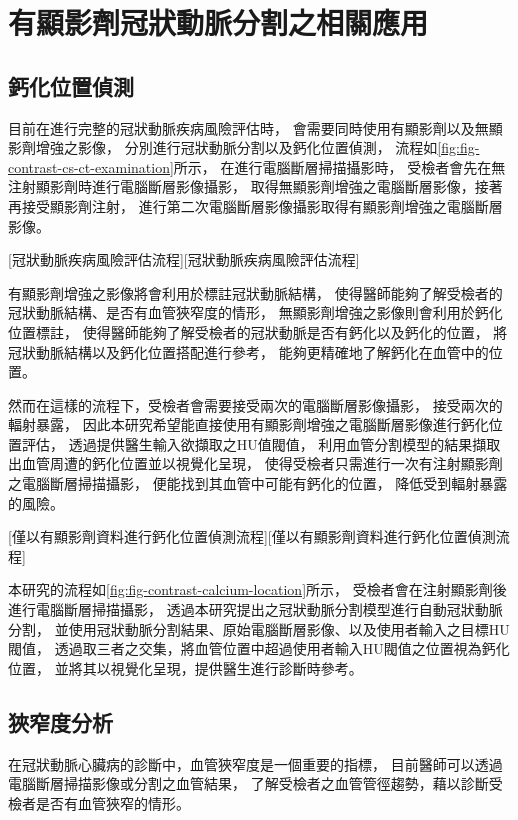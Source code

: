 \documentclass[class=NCU_thesis, crop=false]{standalone}
\begin{document}
\section{有顯影劑冠狀動脈分割之相關應用}
\subsection{鈣化位置偵測}
目前在進行完整的冠狀動脈疾病風險評估時，
會需要同時使用有顯影劑以及無顯影劑增強之影像，
分別進行冠狀動脈分割以及鈣化位置偵測，
流程如\cref{fig:fig-contrast-cs-ct-examination}所示，
在進行電腦斷層掃描攝影時，
受檢者會先在無注射顯影劑時進行電腦斷層影像攝影，
取得無顯影劑增強之電腦斷層影像，接著再接受顯影劑注射，
進行第二次電腦斷層影像攝影取得有顯影劑增強之電腦斷層影像。

[冠狀動脈疾病風險評估流程][冠狀動脈疾病風險評估流程]

有顯影劑增強之影像將會利用於標註冠狀動脈結構，
使得醫師能夠了解受檢者的冠狀動脈結構、是否有血管狹窄度的情形，
無顯影劑增強之影像則會利用於鈣化位置標註，
使得醫師能夠了解受檢者的冠狀動脈是否有鈣化以及鈣化的位置，
將冠狀動脈結構以及鈣化位置搭配進行參考，
能夠更精確地了解鈣化在血管中的位置。

然而在這樣的流程下，受檢者會需要接受兩次的電腦斷層影像攝影，
接受兩次的輻射暴露，
因此本研究希望能直接使用有顯影劑增強之電腦斷層影像進行鈣化位置評估，
透過提供醫生輸入欲擷取之HU值閥值，
利用血管分割模型的結果擷取出血管周遭的鈣化位置並以視覺化呈現，
使得受檢者只需進行一次有注射顯影劑之電腦斷層掃描攝影，
便能找到其血管中可能有鈣化的位置，
降低受到輻射暴露的風險。

[僅以有顯影劑資料進行鈣化位置偵測流程][僅以有顯影劑資料進行鈣化位置偵測流程]

本研究的流程如\cref{fig:fig-contrast-calcium-location}所示，
受檢者會在注射顯影劑後進行電腦斷層掃描攝影，
透過本研究提出之冠狀動脈分割模型進行自動冠狀動脈分割，
並使用冠狀動脈分割結果、原始電腦斷層影像、以及使用者輸入之目標HU閥值，
透過取三者之交集，將血管位置中超過使用者輸入HU閥值之位置視為鈣化位置，
並將其以視覺化呈現，提供醫生進行診斷時參考。


\subsection{狹窄度分析}
在冠狀動脈心臟病的診斷中，血管狹窄度是一個重要的指標，
目前醫師可以透過電腦斷層掃描影像或分割之血管結果，
了解受檢者之血管管徑趨勢，藉以診斷受檢者是否有血管狹窄的情形。
\end{document}
